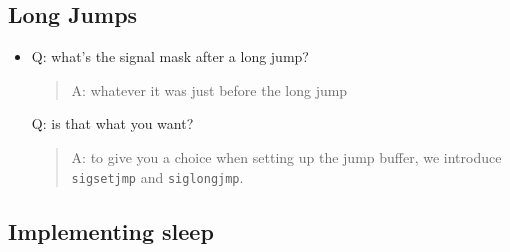 \documentclass[]{article}
\begin{document}
\subsection{\texorpdfstring{\textbf{Long
Jumps}}{Long Jumps}}\label{header-n562}

\begin{itemize}
\item
  Q: what's the signal mask after a long jump?

  \begin{quote}
  A: whatever it was just before the long jump
  \end{quote}

  Q: is that what you want?

  \begin{quote}
  A: to give you a choice when setting up the jump buffer, we introduce
  \texttt{sigsetjmp} and \texttt{siglongjmp}.
  \end{quote}
\end{itemize}

\subsection{\texorpdfstring{\textbf{Implementing
sleep}}{Implementing sleep}}\label{header-n572}
\end{document}
